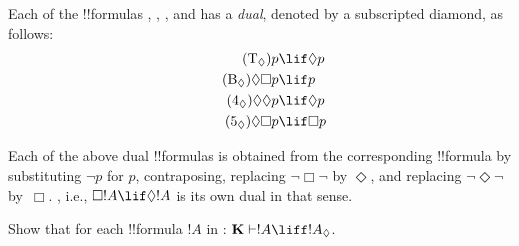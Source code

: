 \documentclass[../../../include/open-logic-section]{subfiles}
\begin{document}


\begin{defn}
  Each of the !!{formula}s , , , and
   has a \emph{dual}, denoted by a subscripted diamond, as
  follows:
  \begin{align}
    \tag{\Ax{T_\Diamond}} p & \lif \Diamond p\\
    \tag{\Ax{B_\Diamond}} \Diamond\Box p & \lif p\\
    \tag{\Ax{4_\Diamond}} \Diamond\Diamond p & \lif \Diamond p\\
    \tag{\Ax{5_\Diamond}} \Diamond\Box p & \lif \Box p
    \end{align}
\end{defn}

Each of the above dual !!{formula}s is obtained from the corresponding
!!{formula} by substituting $\lnot p$ for $p$, contraposing, replacing
$\lnot\Box\lnot$ by $\Diamond$, and replacing $\lnot\Diamond\lnot$
by~$\Box$. , i.e., $\Box!A \lif \Diamond!A$ is its own dual in
that sense.

\begin{prob}
  Show that for each !!{formula} $!A$ in :
  $\Log{K} \Proves !A \liff !A_\Diamond$.
\end{prob}
\end{document}

